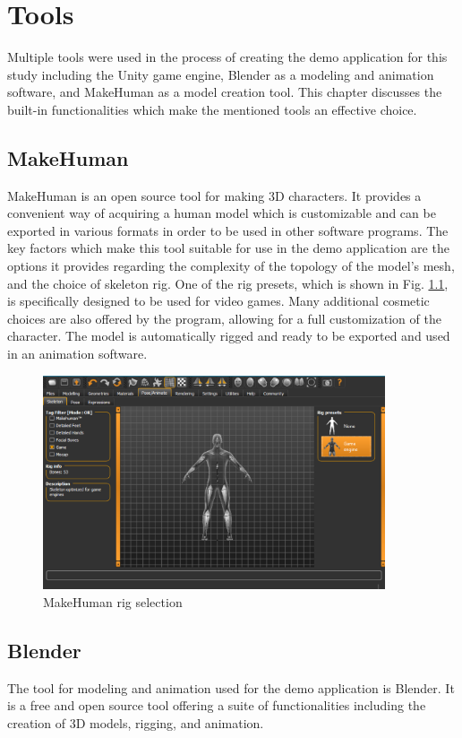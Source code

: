 \chapter{Tools} 
Multiple tools were used in the process of creating the demo application for
this study including the Unity game engine, Blender as a modeling and animation
software, and MakeHuman as a model creation tool. This chapter discusses the
built-in functionalities which make the mentioned tools an effective choice.

\section{MakeHuman}
MakeHuman is an open source tool for making 3D characters. It provides
a convenient way of acquiring a human model which is customizable and can be
exported in various formats in order to be used in other software programs. The
key factors which make this tool suitable for use in the demo application are the
options it provides regarding the complexity of the topology of the model's
mesh, and the choice of skeleton rig. One of the rig presets, which is shown in
Fig. \ref{fig:mh_rig}, is specifically designed to be used for video games. Many
additional cosmetic choices are also offered by the program, allowing for a full
customization of the character. The model is automatically rigged and ready to
be exported and used in an animation software. 

\begin{figure}[!h]
    \centering
    \includegraphics[width=0.9\textwidth]{grafika/make_human_rig.eps}
    \caption{MakeHuman rig selection}
    \label{fig:mh_rig}
\end{figure}

\section{Blender}
The tool for modeling and animation used for the demo application is
Blender. It is a free and open source tool offering a suite of functionalities
including the creation of 3D models, rigging, and animation. 

